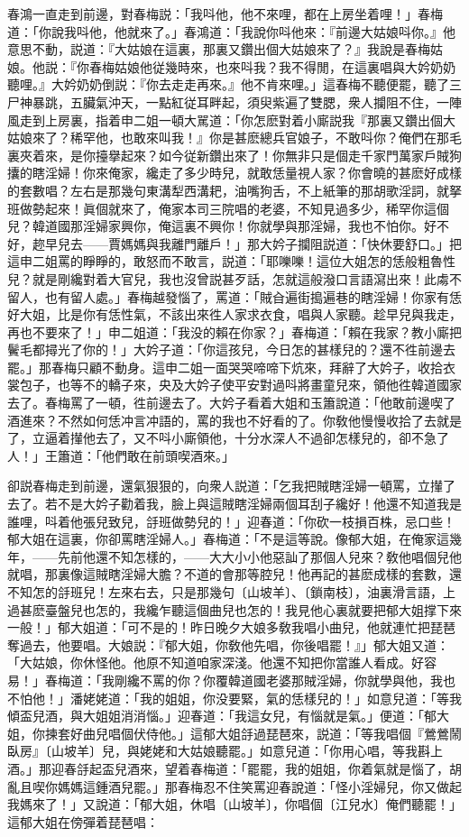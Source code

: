 春鴻一直走到前邊，對春梅説：「我呌他，他不來哩，都在上房坐着哩！」春梅道：「你說我呌他，他就來了。」春鴻道：「我說你呌他來：『前邊大姑娘呌你。』他意思不動，説道：『大姑娘在這裏，那裏又鑽出個大姑娘來了？』我說是春梅姑娘。他説：『你春梅姑娘他従幾時來，也來呌我？我不得閒，在這裏唱與大妗奶奶聽哩。』大妗奶奶倒説：『你去走走再來。』他不肯來哩。」這春梅不聽便罷，聽了三尸神暴跳，五臟氣沖天，一點紅従耳畔起，須臾紫遍了雙腮，衆人攔阻不住，一陣風走到上房裏，指着申二姐一頓大駡道：「你怎麽對着小廝説我『那裏又鑽出個大姑娘來了？稀罕他，也敢來叫我！』你是甚麽總兵官娘子，不敢呌你？俺們在那毛裏夾着來，是你擡擧起來？如今従新鑽出來了！你無非只是個走千家門萬家戶賊狗攮的瞎淫婦！你來俺家，纔走了多少時兒，就敢恁量視人家？你會曉的甚麽好成樣的套數唱？左右是那幾句東溝犁西溝耙，油嘴狗舌，不上紙筆的那胡歌淫詞，就拏班做勢起來！眞個就來了，俺家本司三院唱的老婆，不知見過多少，稀罕你這個兒？韓道國那淫婦家興你，俺這裏不興你！你就學與那淫婦，我也不怕你。好不好，趂早兒去——賈媽媽與我離門離戶！」那大妗子攔阻説道：「快休要舒口。」把這申二姐罵的睜睜的，敢怒而不敢言，説道：「耶嚛嚛！這位大姐怎的恁般粗魯性兒？就是剛纔對着大官兒，我也沒曾説甚歹話，怎就這般潑口言語瀉出來！此䖏不留人，也有留人處。」春梅越發惱了，罵道：「賊㒲遍街搗遍巷的瞎淫婦！你家有恁好大姐，比是你有恁性氣，不該出來徃人家求衣食，唱與人家聽。趁早兒與我走，再也不要來了！」申二姐道：「我没的賴在你家？」春梅道：「賴在我家？教小廝把鬢毛都撏光了你的！」大妗子道：「你這孩兒，今日怎的甚樣兒的？還不徃前邊去罷。」那春梅只顧不動身。這申二姐一面哭哭啼啼下炕來，拜辭了大妗子，收拾衣裳包子，也等不的轎子來，央及大妗子使平安對過呌將畫童兒來，領他徃韓道國家去了。春梅罵了一頓，徃前邊去了。大妗子看着大姐和玉簫說道：「他敢前邊喫了酒進來？不然如何恁冲言冲語的，罵的我也不好看的了。你敎他慢慢收拾了去就是了，立逼着攆他去了，又不呌小廝領他，十分水深人不過卻怎樣兒的，卻不急了人！」王簫道：「他們敢在前頭喫酒來。」

卻説春梅走到前邊，還氣狠狠的，向衆人説道：「乞我把賊瞎淫婦一頓罵，立攆了去了。若不是大妗子勸着我，臉上與這賊瞎淫婦兩個耳刮子纔好！他還不知道我是誰哩，呌着他張兒致兒，㧱班做勢兒的！」迎春道：「你砍一枝損百株，忌口些！郁大姐在這裏，你卻罵瞎淫婦人。」春梅道：「不是這等說。像郁大姐，在俺家這幾年，——先前他還不知怎樣的，——大大小小他惡訕了那個人兒來？敎他唱個兒他就唱，那裏像這賊瞎淫婦大膽？不道的會那等腔兒！他再記的甚麽成樣的套數，還不知怎的㧱班兒！左來右去，只是那幾句〔山坡羊〕、〔鎖南枝〕，油裏滑言語，上過甚麽臺盤兒也怎的，我纔乍聽這個曲兒也怎的！我見他心裏就要把郁大姐撑下來一般！」郁大姐道：「可不是的！昨日晚夕大娘多敎我唱小曲兒，他就連忙把琵琶奪過去，他要唱。大娘説：『郁大姐，你敎他先唱，你後唱罷！』」郁大姐又道：「大姑娘，你休怪他。他原不知道咱家深淺。他還不知把你當誰人看成。好容易！」春梅道：「我剛纔不罵的你？你覆韓道國老婆那賊淫婦，你就學與他，我也不怕他！」潘姥姥道：「我的姐姐，你没要緊，氣的恁樣兒的！」如意兒道：「等我傾盃兒酒，與大姐姐消消惱。」迎春道：「我這女兒，有惱就是氣。」便道：「郁大姐，你揀套好曲兒唱個伏侍他。」這郁大姐㧱過琵琶來，説道：「等我唱個『鶯鶯鬧臥房』〔山坡羊〕兒，與姥姥和大姑娘聽罷。」如意兒道：「你用心唱，等我斟上酒。」那迎春㧱起盃兒酒來，望着春梅道：「罷罷，我的姐姐，你着氣就是惱了，胡亂且喫你媽媽這鍾酒兒罷。」那春梅忍不住笑罵迎春說道：「怪小淫婦兒，你又做起我媽來了！」又說道：「郁大姐，休唱〔山坡羊〕，你唱個〔江兒水〕俺們聽罷！」這郁大姐在傍彈着琵琶唱：


